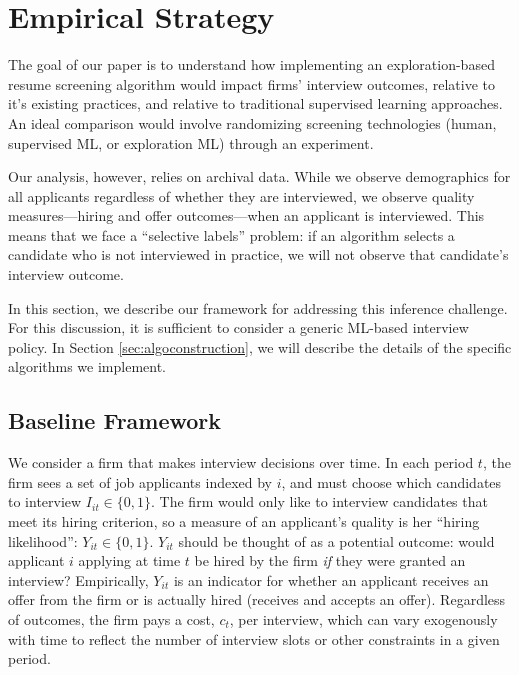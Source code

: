 \documentclass[crop,noquery,editorname,historyrev,nosurname,runningno,sepcount]{RESTUD}
\begin{document}
\section{Empirical Strategy} \label{sec:empirics}

The goal of our paper is to understand how implementing an exploration-based resume screening algorithm would impact firms' interview outcomes, relative to it's existing practices, and relative to traditional supervised learning approaches.   An ideal comparison would involve randomizing screening technologies (human, supervised ML, or exploration ML) through an experiment.  

Our analysis, however, relies on archival data.  While we observe demographics for all applicants regardless of whether they are interviewed, we observe quality measures---hiring and offer outcomes---when an applicant is interviewed.  This means that we face a ``selective labels'' problem: if an algorithm selects a candidate who is not interviewed in practice, we will not observe that candidate's interview outcome.  

In this section, we describe our framework for addressing this inference challenge.  For this discussion, it is sufficient to consider a generic ML-based interview policy.  In Section \ref{sec:algoconstruction}, we will describe the details of the specific algorithms we implement.   

\subsection{Baseline Framework} \label{sec:framework}

We consider a firm that makes interview decisions over time.  In each period $t$, the firm sees a set of job applicants indexed by $i$, and must choose which candidates to interview $I_{it} \in \{0, 1\}$.  The firm would only like to interview candidates that meet its hiring criterion, so a measure of an applicant's quality is her ``hiring likelihood'': $Y_{it} \in \{0,1\}$.  $Y_{it}$ should be thought of as a potential outcome: would applicant $i$ applying at time $t$ be hired by the firm \textit{if} they were granted an interview?  Empirically, $Y_{it}$ is an indicator for whether an applicant receives an offer from the firm or is actually hired (receives and accepts an offer).  Regardless of outcomes, the firm pays a cost, $c_t$, per interview, which can vary exogenously with time to reflect the number of interview slots or other constraints in a given period.  
\end{document}
